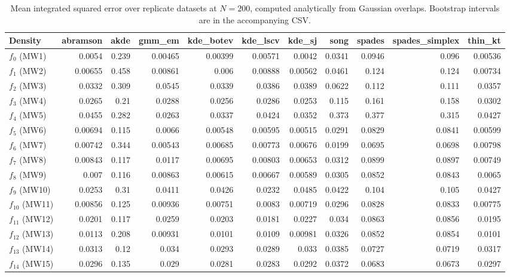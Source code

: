\begin{table}[htbp]
\centering
\caption{Mean integrated squared error over replicate datasets at $N=200$, computed analytically from Gaussian overlaps. Bootstrap intervals are in the accompanying CSV.}
\label{tab:ise-N200}
\begin{tabular}{lrrrrrrrrrr}
\toprule
Density & abramson & akde & gmm\_em & kde\_botev & kde\_lscv & kde\_sj & song & spades & spades\_simplex & thin\_kt \\
\midrule
$f_{0}$ (MW1) & 0.0054 & 0.239 & 0.00465 & 0.00399 & 0.00571 & 0.0042 & 0.0341 & 0.0946 & 0.096 & 0.00536 \\
$f_{1}$ (MW2) & 0.00655 & 0.458 & 0.00861 & 0.006 & 0.00888 & 0.00562 & 0.0461 & 0.124 & 0.124 & 0.00734 \\
$f_{2}$ (MW3) & 0.0332 & 0.309 & 0.0545 & 0.0339 & 0.0386 & 0.0389 & 0.0622 & 0.112 & 0.111 & 0.0357 \\
$f_{3}$ (MW4) & 0.0265 & 0.21 & 0.0288 & 0.0256 & 0.0286 & 0.0253 & 0.115 & 0.161 & 0.158 & 0.0302 \\
$f_{4}$ (MW5) & 0.0455 & 0.282 & 0.0263 & 0.0337 & 0.0424 & 0.0352 & 0.373 & 0.377 & 0.315 & 0.0427 \\
$f_{5}$ (MW6) & 0.00694 & 0.115 & 0.0066 & 0.00548 & 0.00595 & 0.00515 & 0.0291 & 0.0829 & 0.0841 & 0.00599 \\
$f_{6}$ (MW7) & 0.00742 & 0.344 & 0.00543 & 0.00685 & 0.00773 & 0.00676 & 0.0199 & 0.0695 & 0.0698 & 0.00798 \\
$f_{7}$ (MW8) & 0.00843 & 0.117 & 0.0117 & 0.00695 & 0.00803 & 0.00653 & 0.0312 & 0.0899 & 0.0897 & 0.00749 \\
$f_{8}$ (MW9) & 0.007 & 0.116 & 0.00863 & 0.00615 & 0.00667 & 0.00589 & 0.0305 & 0.0852 & 0.0843 & 0.0065 \\
$f_{9}$ (MW10) & 0.0253 & 0.31 & 0.0411 & 0.0426 & 0.0232 & 0.0485 & 0.0422 & 0.104 & 0.105 & 0.0427 \\
$f_{10}$ (MW11) & 0.00856 & 0.125 & 0.00936 & 0.00751 & 0.0083 & 0.00719 & 0.0296 & 0.0828 & 0.0833 & 0.00775 \\
$f_{11}$ (MW12) & 0.0201 & 0.117 & 0.0259 & 0.0203 & 0.0181 & 0.0227 & 0.034 & 0.0863 & 0.0856 & 0.0195 \\
$f_{12}$ (MW13) & 0.0113 & 0.208 & 0.00931 & 0.0101 & 0.0109 & 0.00981 & 0.0326 & 0.0852 & 0.0854 & 0.0101 \\
$f_{13}$ (MW14) & 0.0313 & 0.12 & 0.034 & 0.0293 & 0.0289 & 0.033 & 0.0385 & 0.0727 & 0.0719 & 0.0317 \\
$f_{14}$ (MW15) & 0.0296 & 0.135 & 0.029 & 0.0281 & 0.0283 & 0.0292 & 0.0372 & 0.0683 & 0.0673 & 0.0297 \\
\bottomrule
\end{tabular}
\end{table}


